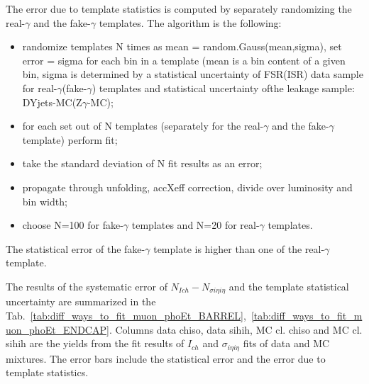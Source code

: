 The error due to template statistics is computed by separately randomizing the real-$\gamma$ and the fake-$\gamma$ templates. The algorithm is the following:

\begin{itemize}
  \item randomize templates N times as mean = random.Gauss(mean,sigma), set error = sigma for each bin in a template (mean is a bin content of a given bin, sigma is determined by a statistical uncertainty of FSR(ISR) data sample for real-$\gamma$(fake-$\gamma$) templates and statistical uncertainty ofthe  leakage sample: DYjets-MC(Z$\gamma$-MC);
  \item for each set out of N templates (separately for the real-$\gamma$ and the fake-$\gamma$ template) perform fit;
  \item take the standard deviation of N fit results as an error;
  \item propagate through unfolding, accXeff correction, divide over luminosity and bin width;
  \item choose N=100 for fake-$\gamma$ templates and N=20 for real-$\gamma$ templates.
\end{itemize}

The statistical error of the fake-$\gamma$ template is higher than one of the real-$\gamma$ template.

The results of the systematic error of $N_{Ich}-N_{\sigma i\eta i\eta}$ and the template statistical uncertainty are summarized in the Tab.~\ref{tab:diff_ways_to_fit_muon_phoEt_BARREL},~\ref{tab:diff_ways_to_fit_muon_phoEt_ENDCAP}. Columns data chiso, data sihih, MC cl. chiso and MC cl. sihih are the yields from the fit results of $I_{ch}$ and $\sigma_{i\eta i\eta}$ fits of data and MC mixtures. The error bars include the statistical error and the error due to template statistics. %

